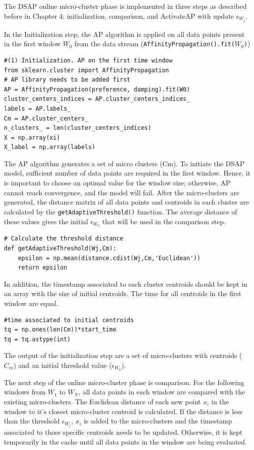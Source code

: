The DSAP online micro-cluster phase is implemented in three steps as described before in Chapter 4: initialization, comparison, and ActivateAP with update $\epsilon_{W_j}$.

In the Initialization step, the AP algorithm is applied on all data points present in the first window $W_0$ from the data stream (\texttt{AffinityPropagation().fit($W_0$)})

\begin{lstlisting}
#(1) Initialization. AP on the first time window
from sklearn.cluster import AffinityPropagation 
# AP library needs to be added first
AP = AffinityPropagation(preference, damping).fit(W0)
cluster_centers_indices = AP.cluster_centers_indices_
labels = AP.labels_
Cm = AP.cluster_centers_
n_clusters_ = len(cluster_centers_indices)
X = np.array(xi)
X_label = np.array(labels)
\end{lstlisting}

The AP algorithm generates a set of micro clusters (Cm). To initiate the DSAP model, sufficient number of data points are required in the first window. Hence, it is important to choose an optimal value for the window size; otherwise, AP cannot reach convergence, and the model will fail. After the micro-clusters are generated, the distance matrix of all data points and centroids in each cluster are calculated by the \texttt{getAdaptiveThreshold()} function. The average distance of these values gives the initial $\epsilon_{W_0}$ that will be used in the comparison step.


\begin{lstlisting}
# Calculate the threshold distance
def getAdaptiveThreshold(Wj,Cm):
    epsilon = np.mean(distance.cdist(Wj,Cm,'Euclidean'))
    return epsilon 
\end{lstlisting}

In addition, the timestamp associated to each cluster centroids should be kept in an array with the size of initial centroids. The time for all centroids in the first window are equal.

\begin{lstlisting}
#time associated to initial centroids
tq = np.ones(len(Cm))*start_time
tq = tq.astype(int)
\end{lstlisting}


The output of the initialization step are a set of micro-clusters with centroids ($C_m$) and an initial threshold value ($\epsilon_{W_0}$).

The next step of the online micro-cluster phase is comparison. For the following windows from $W_1$ to $W_N$, all data points in each window are compared with the existing micro-clusters. The Euclidean distance of each new point $x_i$ in the window to it's closest micro-cluster centroid is calculated. If the distance is less than the threshold $\epsilon_{W_j}$, $x_i$ is added to the micro-clusters and the timestamp associated to those specific centroids needs to be updated. Otherwise, it is kept temporarily in the cache until all data points in the window are being evaluated. 

